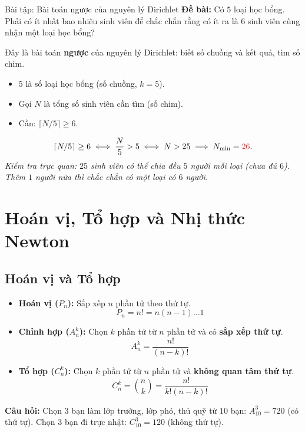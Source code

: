 \documentclass[12pt,a4paper]{article}
\begin{document}
\begin{baitap}{Bài tập: Bài toán ngược của nguyên lý Dirichlet}
\textbf{Đề bài:} Có $5$ loại học bổng. Phải có ít nhất bao nhiêu sinh viên để chắc chắn rằng có ít ra là $6$ sinh viên cùng nhận một loại học bổng?

Đây là bài toán \textbf{ngược} của nguyên lý Dirichlet: biết số chuồng và kết quả, tìm số chim.
\begin{itemize}
  \item $5$ là số loại học bổng (số chuồng, $k = 5$).
  \item Gọi $N$ là tổng số sinh viên cần tìm (số chim).
  \item Cần: $\lceil N/5 \rceil \ge 6$.
\end{itemize}
\[
  \lceil N/5 \rceil \ge 6 \iff \frac{N}{5} > 5 \iff N > 25 \implies N_{\min} = \textcolor{AccentRed}{26}.
\]
\textit{Kiểm tra trực quan: $25$ sinh viên có thể chia đều $5$ người mỗi loại (chưa đủ $6$). Thêm $1$ người nữa thì chắc chắn có một loại có $6$ người.}
\end{baitap}

\section{Hoán vị, Tổ hợp và Nhị thức Newton}

\subsection{Hoán vị và Tổ hợp}

\begin{itemize}
  \item \textbf{Hoán vị ($P_n$):} Sắp xếp $n$ phần tử theo thứ tự.
  \[
    P_n = n! = n(n-1)\dots 1
  \]

  \item \textbf{Chỉnh hợp ($A_n^k$):} Chọn $k$ phần tử từ $n$ phần tử và có \textbf{sắp xếp thứ tự}.
  \[
    A_n^k = \frac{n!}{(n-k)!}
  \]

  \item \textbf{Tổ hợp ($C_n^k$):} Chọn $k$ phần tử từ $n$ phần tử và \textbf{không quan tâm thứ tự}.
  \[
    C_n^k = \binom{n}{k} = \frac{n!}{k!(n-k)!}
  \]
\end{itemize}

\textbf{Câu hỏi:} Chọn $3$ bạn làm lớp trưởng, lớp phó, thủ quỹ từ $10$ bạn: $A_{10}^3 = 720$ (có thứ tự). Chọn $3$ bạn đi trực nhật: $C_{10}^3 = 120$ (không thứ tự).
\end{document}
